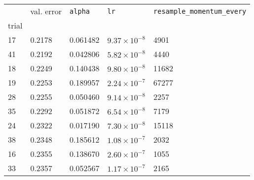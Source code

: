 \begin{tabular}{lp{2.3cm}p{2.3cm}p{2.3cm}p{2.3cm}}
\toprule
{} &  val. error &  \texttt{alpha} &         \texttt{lr} &  \texttt{resample\_momentum\_every} \\
trial &             &                 &                     &                                     \\
\midrule
17    &      0.2178 &        0.061482 & $9.37\times10^{-8}$ &                                4901 \\
41    &      0.2192 &        0.042806 & $5.82\times10^{-8}$ &                                4440 \\
18    &      0.2249 &        0.140438 & $9.80\times10^{-8}$ &                               11682 \\
19    &      0.2253 &        0.189957 & $2.24\times10^{-7}$ &                               67277 \\
28    &      0.2255 &        0.050460 & $9.14\times10^{-8}$ &                                2257 \\
35    &      0.2292 &        0.051872 & $6.54\times10^{-8}$ &                                7179 \\
24    &      0.2322 &        0.017190 & $7.30\times10^{-8}$ &                               15118 \\
38    &      0.2348 &        0.185612 & $1.08\times10^{-7}$ &                                2032 \\
16    &      0.2355 &        0.138670 & $2.60\times10^{-7}$ &                                1055 \\
33    &      0.2357 &        0.052567 & $1.17\times10^{-7}$ &                                2165 \\
\bottomrule
\end{tabular}
